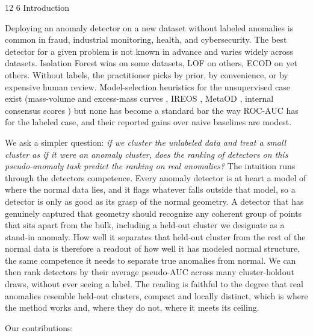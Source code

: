 \documentclass[3p,twocolumn]{elsarticle}
\makeatletter
\renewcommand\section{\@startsection{section}{1}{\z@}%
           {12\p@ \@plus 4\p@ \@minus 4\p@}%
           {6\p@ \@plus 4\p@ \@minus 3\p@}%
           {\normalsize\bfseries\boldmath}}
\makeatother
\begin{document}
\section{Introduction}\label{1-introduction}

Deploying an anomaly detector on a new dataset without labeled anomalies is common in fraud, industrial monitoring, health, and cybersecurity. The best detector for a given problem is not known in advance and varies widely across datasets. Isolation Forest wins on some datasets, LOF on others, ECOD on yet others. Without labels, the practitioner picks by prior, by convenience, or by expensive human review. Model-selection heuristics for the unsupervised case exist (mass-volume and excess-mass curves \cite{ref1}, IREOS \cite{ref2}, MetaOD \cite{ref3}, internal consensus scores \cite{ref4}) but none has become a standard bar the way ROC-AUC has for the labeled case, and their reported gains over naive baselines are modest.

We ask a simpler question: \emph{if we cluster the unlabeled data and treat a small cluster as if it were an anomaly cluster, does the ranking of detectors on this pseudo-anomaly task predict the ranking on real anomalies?} The intuition runs through the detector\textquotesingle s competence. Every anomaly detector is at heart a model of where the normal data lies, and it flags whatever falls outside that model, so a detector is only as good as its grasp of the normal geometry. A detector that has genuinely captured that geometry should recognize any coherent group of points that sits apart from the bulk, including a held-out cluster we designate as a stand-in anomaly. How well it separates that held-out cluster from the rest of the normal data is therefore a readout of how well it has modeled normal structure, the same competence it needs to separate true anomalies from normal. We can then rank detectors by their average pseudo-AUC across many cluster-holdout draws, without ever seeing a label. The reading is faithful to the degree that real anomalies resemble held-out clusters, compact and locally distinct, which is where the method works and, where they do not, where it meets its ceiling.

Our contributions:
\end{document}
